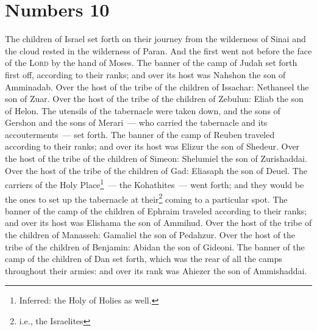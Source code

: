 \section{Numbers 10}\label{Numbers 10}
\begin{enumerate}
     The children of Israel set forth on their journey from the wilderness of Sinai and the cloud rested in the wilderness of Paran.%
     And the first went not before the face of the \textsc{Lord} by the hand of Moses.%
     The banner of the camp of Judah set forth first off, according to their ranks; and over its host was Nahshon the son of Amminadab.%
     Over the host of the tribe of the children of Issachar: Nethaneel the son of Zuar.%
     Over the host of the tribe of the children of Zebulun: Eliab the son of Helon.%
     The utensils of the tabernacle were taken down, and the sons of Gershon and the sons of Merari~--- who carried the tabernacle and its accouterments~--- set forth.%
     The banner of the camp of Reuben traveled according to their ranks; and over its host was Elizur the son of Shedeur.%
     Over the host of the tribe of the children of Simeon: Shelumiel the son of Zurishaddai.%
     Over the host of the tribe of the children of Gad: Eliasaph the son of Deuel.%
     The carriers of the Holy Place\footnote{Inferred: the Holy of Holies as well.}~--- the Kohathites~--- went forth; and they would be the ones to set up the tabernacle at their\footnote{i.e., the Israelites} coming to a particular spot.%
     The banner of the camp of the children of Ephraim traveled according to their ranks; and over its host was Elishama the son of Ammihud.%
     Over the host of the tribe of the children of Manasseh: Gamaliel the son of Pedahzur.%
     Over the host of the tribe of the children of Benjamin: Abidan the son of Gideoni.%
     The banner of the camp of the children of Dan set forth, which was the rear of all the camps throughout their armies: and over its rank was Ahiezer the son of Ammishaddai.%

\end{enumerate}
